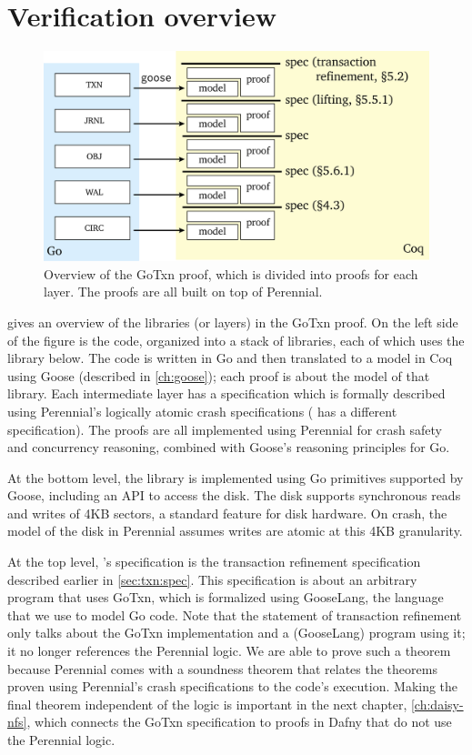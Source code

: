 \section{Verification overview}%
\label{sec:txn:overview}

\begin{figure}
  \centering
  \includegraphics{fig/gotxn.png}
  \caption[Overview of the GoTxn proof layers]%
{Overview of the GoTxn proof, which is divided into proofs for each
    layer. The proofs are all built on top of Perennial.}
  \label{fig:txn:proof-overview}
\end{figure}

 gives an overview of the libraries (or layers) in
the GoTxn proof. On the left side of the figure is the code, organized into a
stack of libraries, each of which uses the library below. The code is written in
Go and then translated to a model in Coq using Goose (described in
\cref{ch:goose}); each proof is about the model of that library. Each
intermediate layer has a specification which is formally described using
Perennial's logically atomic crash specifications ( has a different
specification). The proofs are all implemented using Perennial for crash safety
and concurrency reasoning, combined with Goose's reasoning principles for Go.

At the bottom level, the  library is implemented using Go primitives
supported by Goose, including an API to access the disk. The disk supports
synchronous reads and writes of 4KB sectors, a standard feature for disk
hardware. On crash, the model of the disk in Perennial assumes writes are atomic
at this 4KB granularity.

At the top level, 's specification is the transaction refinement
specification described earlier in \cref{sec:txn:spec}. This specification is
about an arbitrary program that uses GoTxn, which is formalized using GooseLang,
the language that we use to model Go code. Note that the statement of transaction
refinement only talks about the GoTxn implementation and a (GooseLang) program
using it; it no longer references the Perennial logic. We are able to prove such
a theorem because Perennial comes with a soundness theorem that relates the
theorems proven using Perennial's crash specifications to the code's execution.
Making the final theorem independent of the logic is important in the next
chapter, \cref{ch:daisy-nfs}, which connects the GoTxn specification to proofs
in Dafny that do not use the Perennial logic.
